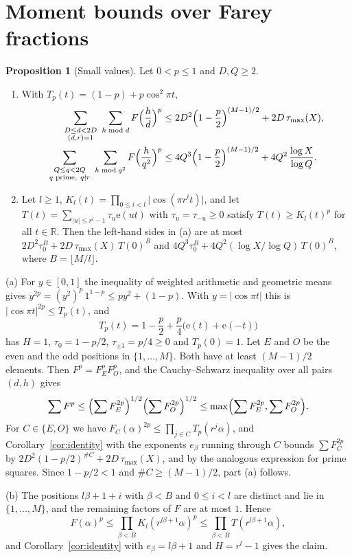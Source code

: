 \documentclass[11pt]{amsart}
\makeatletter
\theoremstyle{definition}
\newtheorem{proposition}[theorem]{Proposition}
\numberwithin{equation}{section}
\renewenvironment{proof}[1][\proofname]{\par\pushQED{\qed}\normalfont\topsep6\p@\@plus6\p@\relax\trivlist\item[\hskip\labelsep\upshape#1.]\ignorespaces}{\popQED\endtrivlist\@endpefalse}
\newcommand{\e}{\mathrm{e}}
\newcommand{\R}{\mathbb{R}}
\newcommand{\tmax}{\tau_{\max}}
\makeatother
\begin{document}
\section{Moment bounds over Farey fractions}\label{sec:moments}

\begin{proposition}[Small values]\label{prop:W}
Let $0<p\le1$ and $D,Q\ge2$.
\begin{enumerate}
\item[(a)] With $T_p(t)=(1-p)+p\cos^2\pi t$,
\begin{align*}
\sum_{\substack{D\le d<2D\\(d,r)=1}}\ \sum_{h\bmod d}F\Bigl(\frac hd\Bigr)^p&\le2D^2\Bigl(1-\frac p2\Bigr)^{(M-1)/2}+2D\,\tmax(X),\\
\sum_{\substack{Q\le q<2Q\\q\text{ prime},\ q\nmid r}}\ \sum_{h\bmod q^2}F\Bigl(\frac h{q^2}\Bigr)^p&\le4Q^3\Bigl(1-\frac p2\Bigr)^{(M-1)/2}+4Q^2\,\frac{\log X}{\log Q}.
\end{align*}
\item[(b)] Let $l\ge1$, $K_l(t)=\prod_{0\le i<l}\lvert\cos(\pi r^it)\rvert$, and let $T(t)=\sum_{\lvert u\rvert\le r^l-1}\tau_u\e(ut)$ with $\tau_u=\tau_{-u}\ge0$ satisfy $T(t)\ge K_l(t)^p$ for all $t\in\R$. Then the left-hand sides in (a) are at most $2D^2\tau_0^B+2D\,\tmax(X)\,T(0)^B$ and $4Q^3\tau_0^B+4Q^2(\log X/\log Q)\,T(0)^B$, where $B=\lfloor M/l\rfloor$.
\end{enumerate}
\end{proposition}

\begin{proof}
(a) For $y\in[0,1]$ the inequality of weighted arithmetic and geometric means gives $y^{2p}=(y^2)^p\,1^{1-p}\le py^2+(1-p)$. With $y=\lvert\cos\pi t\rvert$ this is $\lvert\cos\pi t\rvert^{2p}\le T_p(t)$, and
\[
T_p(t)=1-\frac p2+\frac p4\bigl(\e(t)+\e(-t)\bigr)
\]
has $H=1$, $\tau_0=1-p/2$, $\tau_{\pm1}=p/4\ge0$ and $T_p(0)=1$. Let $E$ and $O$ be the even and the odd positions in $\{1,\dots,M\}$. Both have at least $(M-1)/2$ elements. Then $F^p=F_E^pF_O^p$, and the Cauchy--Schwarz inequality over all pairs $(d,h)$ gives
\[
\sum F^p\le\Bigl(\sum F_E^{2p}\Bigr)^{1/2}\Bigl(\sum F_O^{2p}\Bigr)^{1/2}\le\max\Bigl(\sum F_E^{2p},\sum F_O^{2p}\Bigr).
\]
For $C\in\{E,O\}$ we have $F_C(\alpha)^{2p}\le\prod_{j\in C}T_p(r^j\alpha)$, and Corollary~\ref{cor:identity} with the exponents $e_\beta$ running through $C$ bounds $\sum F_C^{2p}$ by $2D^2(1-p/2)^{\#C}+2D\,\tmax(X)$, and by the analogous expression for prime squares. Since $1-p/2<1$ and $\#C\ge(M-1)/2$, part (a) follows.

(b) The positions $l\beta+1+i$ with $\beta<B$ and $0\le i<l$ are distinct and lie in $\{1,\dots,M\}$, and the remaining factors of $F$ are at most $1$. Hence
\[
F(\alpha)^p\le\prod_{\beta<B}K_l(r^{l\beta+1}\alpha)^p\le\prod_{\beta<B}T(r^{l\beta+1}\alpha),
\]
and Corollary~\ref{cor:identity} with $e_\beta=l\beta+1$ and $H=r^l-1$ gives the claim.
\end{proof}
\end{document}
